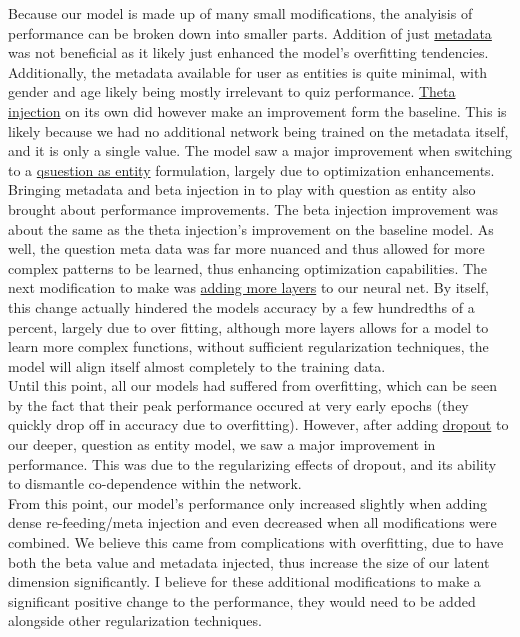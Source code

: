 \documentclass{article}
\begin{document}
Because our model is made up of many small modifications, the analyisis of performance can be broken down into smaller parts. Addition of just \underline{metadata} was not beneficial as it likely just enhanced the model's overfitting tendencies. Additionally, the metadata available for user as entities is quite minimal, with gender and age likely being mostly irrelevant to quiz performance. \underline{Theta injection} on its own did however make an improvement form the baseline. This is likely because we had no additional network being trained on the metadata itself, and it is only a single value. The model saw a major improvement when switching to a \underline{qsuestion as entity} formulation, largely due to optimization enhancements.
\\
Bringing metadata and beta injection in to play with question as entity also brought about performance improvements. The beta injection improvement was about the same as the theta injection's improvement on the baseline model. As well, the question meta data was far more nuanced and thus allowed for more complex patterns to be learned, thus enhancing optimization capabilities. The next modification to make was \underline{adding more layers} to our neural net. By itself, this change actually hindered the models accuracy by a few hundredths of a percent, largely due to over fitting, although more layers allows for a model to learn more complex functions, without sufficient regularization techniques, the model will align itself almost completely to the training data.
\\
Until this point, all our models had suffered from overfitting, which can be seen by the fact that their peak performance occured at very early epochs (they quickly drop off in accuracy due to overfitting). However, after adding \underline{dropout} to our deeper, question as entity model, we saw a major improvement in performance. This was due to the regularizing effects of dropout, and its ability to dismantle co-dependence within the network. 
\\From this point, our model's performance only increased slightly when adding dense re-feeding/meta injection and even decreased when all modifications were combined. We believe this came from complications with overfitting, due to have both the beta value and metadata injected, thus increase the size of our latent dimension significantly. I believe for these additional modifications to make a significant positive change to the performance, they would need to be added alongside other regularization techniques.
\end{document}
